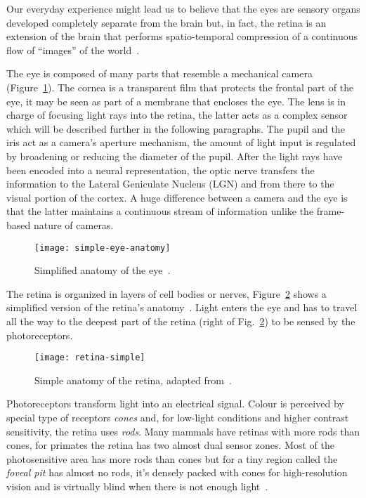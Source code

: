 Our everyday experience might lead us to believe that the eyes are sensory organs developed completely separate from the brain but, in fact, the retina is an extension of the brain that performs spatio-temporal compression of a continuous flow of ``images'' of the world~\cite{eye-brain-vision-hubel1995}.

The eye is composed of many parts that resemble a mechanical camera (Figure~\ref{fig:vision:eye}). The cornea is a transparent film that protects the frontal part of the eye, it may be seen as part of a membrane that encloses the eye. The lens is in charge of focusing light rays into the retina, the latter acts as a complex sensor which will be described further in the following paragraphs. The pupil and the iris act as a camera's aperture mechanism, the amount of light input is regulated by broadening or reducing the diameter of the pupil. After the light rays have been encoded into a neural representation, the optic nerve transfers the information to the Lateral Geniculate Nucleus (LGN) and from there to the visual portion of the cortex. A huge difference between a camera and the eye is that the latter maintains a continuous stream of information unlike the frame-based nature of cameras.

\begin{figure}[htb]
  \begin{center}
    \texttt{[image: simple-eye-anatomy]}
    \caption{Simplified anatomy of the eye~\cite{webvision-images}.}
    \label{fig:vision:eye}
  \end{center}
\end{figure}

The retina is organized in layers of cell bodies or nerves,  Figure~\ref{fig:vision:simple-retina} shows a simplified version of the retina's anatomy~\cite{webvision-simple-retina}. Light enters the eye and has to travel all the way to the deepest part of the retina (right of Fig.~\ref{fig:vision:simple-retina}) to be sensed by the photoreceptors. 

\begin{figure}[h]
  \begin{center}
    \texttt{[image: retina-simple]}
    \caption{Simple anatomy of the retina, adapted from~\cite{webvision-images}.}
    \label{fig:vision:simple-retina}
  \end{center}
\end{figure}

Photoreceptors transform light into an electrical signal. Colour is perceived by special type of receptors \emph{cones} and, for low-light conditions and higher contrast sensitivity, the retina uses \emph{rods}. Many mammals have retinas with more rods than cones, for primates the retina has two almost dual sensor zones. Most of the photosensitive area has more rods than cones but for a tiny region called the \emph{foveal pit} has almost no rods, it's densely packed with cones for high-resolution vision and is virtually blind when there is not enough light~\cite{eye-brain-vision-hubel1995}.


